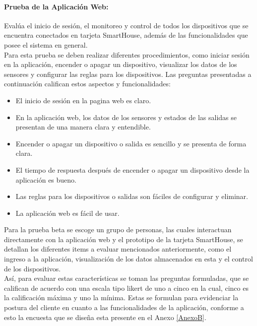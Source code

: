 \paragraph{Prueba de la Aplicación Web:} Evalúa el inicio de sesión, el monitoreo y control de todos los dispositivos que se encuentra conectados en tarjeta SmartHouse, además de las funcionalidades que posee el sistema en general.\\

Para esta prueba se deben realizar diferentes procedimientos, como iniciar sesión en la aplicación, encender o apagar un dispositivo, visualizar los datos de los sensores y configurar las reglas para los dispositivos. Las preguntas presentadas a continuación califican estos aspectos y funcionalidades:\\

\begin{itemize}
	\item El inicio de sesión en la pagina web es claro.
	\item En la aplicación web, los datos de los sensores y estados de las salidas se presentan de una manera clara y entendible.
	\item Encender o apagar un dispositivo o salida es sencillo y se presenta de forma clara.
	\item El tiempo de respuesta después de encender o apagar un dispositivo desde la aplicación es bueno.
	\item Las reglas para los dispositivos o salidas son fáciles de configurar y eliminar.
	\item La aplicación web es fácil de usar.
\end{itemize}

Para la prueba beta se escoge un grupo de personas, las cuales interactuan directamente con la aplicación web y el prototipo de la tarjeta SmartHouse, se detallan los diferentes items a evaluar mencionados anteriormente, como el ingreso a la aplicación, visualización de los datos almacenados en esta y el control de los dispositivos.\\

Así, para evaluar estas características se toman las preguntas formuladas, que se califican de acuerdo con una escala tipo likert \cite{lik} de uno a cinco en la cual, cinco es la calificación máxima y uno la mínima. Estas se formulan para evidenciar la postura del cliente en cuanto a las funcionalidades de la aplicación, conforme a esto la encuesta que se diseña esta presente en el Anexo \ref{AnexoB}.\\

